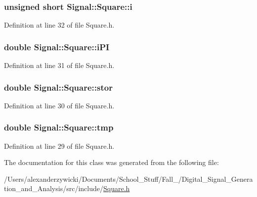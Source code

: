 \hypertarget{class_signal_1_1_square_a3170f60bd41cbd43c861a63e0a5ae31d}{
\subsubsection[{i}]{\setlength{\rightskip}{0pt plus 5cm}unsigned short Signal\+::\+Square\+::i\hspace{0.3cm}{\ttfamily [protected]}}}\label{class_signal_1_1_square_a3170f60bd41cbd43c861a63e0a5ae31d}


Definition at line 32 of file Square.\+h.

\hypertarget{class_signal_1_1_square_a9c43074c487301290c48ddf736010cdf}{
\subsubsection[{i\+P\+I}]{\setlength{\rightskip}{0pt plus 5cm}double Signal\+::\+Square\+::i\+P\+I\hspace{0.3cm}{\ttfamily [protected]}}}\label{class_signal_1_1_square_a9c43074c487301290c48ddf736010cdf}


Definition at line 31 of file Square.\+h.

\hypertarget{class_signal_1_1_square_ae63c68380aa8e98f1bca6acdf56bb1c0}{
\subsubsection[{stor}]{\setlength{\rightskip}{0pt plus 5cm}double Signal\+::\+Square\+::stor\hspace{0.3cm}{\ttfamily [protected]}}}\label{class_signal_1_1_square_ae63c68380aa8e98f1bca6acdf56bb1c0}


Definition at line 30 of file Square.\+h.

\hypertarget{class_signal_1_1_square_ac910bb3a32660a3f0e2bd85df7afd9c0}{
\subsubsection[{tmp}]{\setlength{\rightskip}{0pt plus 5cm}double Signal\+::\+Square\+::tmp\hspace{0.3cm}{\ttfamily [protected]}}}\label{class_signal_1_1_square_ac910bb3a32660a3f0e2bd85df7afd9c0}


Definition at line 29 of file Square.\+h.



The documentation for this class was generated from the following file\+:\begin{DoxyCompactItemize}
\item 
/\+Users/alexanderzywicki/\+Documents/\+School\+\_\+\+Stuff/\+Fall\+\_/\+Digital\+\_\+\+Signal\+\_\+\+Generation\+\_\+and\+\_\+\+Analysis/src/include/\hyperlink{_square_8h}{Square.\+h}\end{DoxyCompactItemize}
